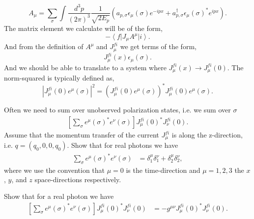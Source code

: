 \documentclass[working, oneside]{../../../Preambles/tuftebook}
\begin{document}
\[
A_{\mu } = \sum_{\sigma}\int \frac{d^3p}{\left( 2\pi \right) ^{3}}\frac{1}{\sqrt{2E_p} }\left( a_{p, \sigma}\epsilon_{\mu }\left( \sigma \right) e^{-ipx}+a_{p,\sigma}^{\dagger}\epsilon_{\mu }\left( \sigma \right) ^{*}e^{ipx} \right) 
.\] 
The matrix element we calculate will be of the form,
\[
-\left<f \right|J_{\mu }A^{\mu }\left|i \right>
.\] 
And from the definition of $A^{\mu }$ and $J_\mu^{fi} $ we get terms of the form,
\[
J^{fi}_{\mu }\left( x \right) \epsilon_{\mu }\left( \sigma \right) 
.\] 
And we should be able to translate to a system where $J_{\mu }^{fi}\left( x \right) \to J_{\mu }^{fi}\left( 0 \right) $. The norm-squared is typically defined as,
\[
\left|   J_{\mu }^{fi}\left( 0 \right) e^{\mu }\left( \sigma \right) \right|^2 = \left(J_{\mu }^{fi}\left( 0 \right) e^{\mu }\left( \sigma \right)   \right)^{*}J_{\mu }^{fi}\left( 0 \right) e^{\mu }\left( \sigma \right)
.\] 
\begin{exercise}[8]
Often we need to sum over unobserved polarization states, i.e. we sum over \( \sigma \)
\begin{align*}
\left[ \sum_{\sigma} e^{\mu}(\sigma)^* e^{\nu}(\sigma) \right] J_{\mu}^{fi}(0)^* J_{\nu}^{fi}(0). \tag{26}
\end{align*}
Assume that the momentum transfer of the current \( J_\mu^{fi} \) is along the z-direction, i.e. \( q = (q_0, 0, 0, q_0) \). Show that for real photons we have
\begin{align*}
\sum_{\sigma} e^{\mu}(\sigma)^* e^{\nu}(\sigma)
&= \delta_1^\mu \delta_1^\nu + \delta_2^\mu \delta_2^\nu, \tag{27}
\end{align*}
where we use the convention that \( \mu = 0 \) is the time-direction and \( \mu = 1, 2, 3 \) the \( x \), \( y \), and \( z \) space-directions respectively.
\end{exercise}

\begin{exercise}[9]
Show that for a real photon we have
\begin{align*}
\left[ \sum_{\sigma} e^{\mu}(\sigma)^* e^{\nu}(\sigma) \right] J_{\mu}^{fi}(0)^* J_{\nu}^{fi}(0)
&= -g^{\mu \nu} J_{\mu}^{fi}(0)^* J_{\nu}^{fi}(0). \tag{28}
\end{align*}
\end{exercise}
\end{document}

